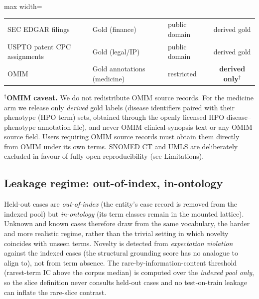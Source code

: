 \documentclass[pdflatex,sn-nature]{sn-jnl}
\begin{document}
\begin{appendices}
\begin{table}[htbp]
\begin{adjustbox}{max width=\textwidth}
\begin{tabular}{lllc}
SEC EDGAR filings                   & Gold (finance)             & public domain  & derived gold \\
USPTO patent CPC assignments        & Gold (legal/IP)            & public domain  & derived gold \\
OMIM                                & Gold annotations (medicine)& restricted     & \textbf{derived only}$^\dagger$ \\
\bottomrule
\end{tabular}\end{adjustbox}
\begin{flushleft}
{\footnotesize
$^\dagger$\textbf{OMIM caveat.} We do not redistribute OMIM source records. For the
medicine arm we release only \emph{derived} gold labels (disease identifiers
paired with their phenotype (HPO term) sets, obtained through the openly licensed
HPO disease--phenotype annotation file), and never OMIM clinical-synopsis text or
any OMIM source field. Users requiring OMIM source records must obtain them
directly from OMIM under its own terms.
SNOMED CT and UMLS are deliberately excluded in favour of fully open
reproducibility (see Limitations).}
\end{flushleft}
\label{tab:ed7_licenses}
\end{table}



\subsection*{Leakage regime: out-of-index, in-ontology}

Held-out cases are \emph{out-of-index} (the entity's case record is removed
from the indexed pool) but \emph{in-ontology} (its term classes remain in the
mounted lattice). Unknown and known cases therefore draw from the same
vocabulary, the harder and more realistic regime, rather than the trivial
setting in which novelty coincides with unseen terms. Novelty is detected from
\emph{expectation violation} against the indexed cases (the structural
grounding score has no analogue to align to), not from term absence. The
rare-by-information-content threshold (rarest-term IC above the corpus median)
is computed over the \emph{indexed pool only}, so the slice definition never
consults held-out cases and no test-on-train leakage can inflate the rare-slice
contrast.


\end{appendices}
\end{document}
